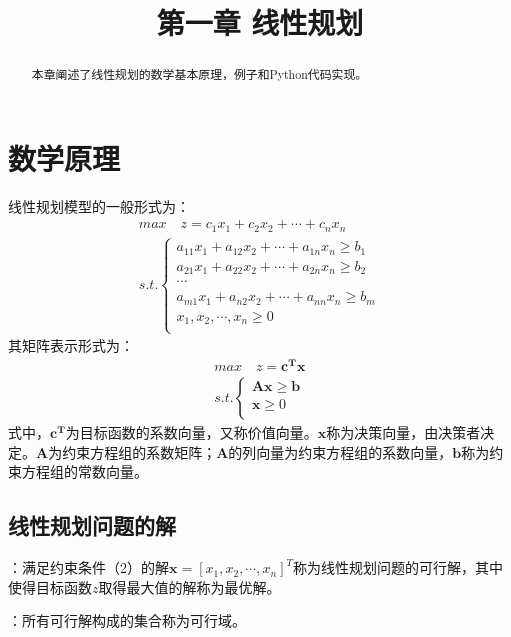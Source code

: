 \documentclass{article}
\title{第一章 \quad 线性规划}
\begin{document}
\maketitle
\begin{abstract}
	本章阐述了线性规划的数学基本原理，例子和Python代码实现。
\end{abstract}

\section{数学原理}
线性规划模型的一般形式为：
	\begin{equation}
		\begin{split}
			max \quad z = c_1x_1 + c_2x_2 + \cdots + c_nx_n \\
			s.t.\begin{cases}
				a_{11}x_1 + a_{12}x_2 + \cdots + a_{1n}x_n \geq b_1 \\
				a_{21}x_1 + a_{22}x_2 + \cdots + a_{2n}x_n \geq b_2 \\
				\cdots											    \\
				a_{m1}x_1 + a_{n2}x_2 + \cdots + a_{nn}x_n \geq b_m	\\
				x_1,x_2,\cdots,x_n \geq 0							\\
 			\end{cases}
		\end{split}
	\end{equation}
其矩阵表示形式为：
	\begin{equation}
		\begin{split}
			max \quad z = \bm{c^Tx} \\
			s.t.\begin{cases}
				\bm{Ax} \geq \bm{b} \\
				\bm{x} \geq 0 		\\
			\end{cases}
		\end{split}
	\end{equation}
式中，$\bm{c^T}$为目标函数的系数向量，又称价值向量。$\bm{x}$称为决策向量，由决策者决定。$\bm{A}$为约束方程组的系数矩阵；$\bm{A}$的列向量为约束方程组的系数向量，$\bm{b}$称为约束方程组的常数向量。
\subsection{线性规划问题的解}
：满足约束条件（2）的解$\bm{x} = [x_1,x_2,\cdots,x_n]^T$称为线性规划问题的可行解，其中使得目标函数$z$取得最大值的解称为最优解。

：所有可行解构成的集合称为可行域。
\end{document}
